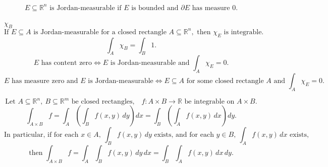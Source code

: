 \documentclass[11pt]{article}
\newcommand{\R}{\mathbb R}
\begin{document}
\[
E\subseteq\R^n\text{ is Jordan-measurable if }E\text{ is bounded and }\partial E\text{ has measure }0.
\]

\(\chi_B\)
\[
\text{If }E\subseteq A\text{ is Jordan-measurable for a closed rectangle }A\subseteq\R^n,
\text{ then }\chi_E\text{ is integrable.}
\]
\[
\int_A\chi_B=\int_B1.
\]
\[
E\text{ has content zero}\Longleftrightarrow E\text{ is Jordan-measurable and }\int_A\chi_E=0.
\]
\[
E\text{ has measure zero and }E\text{ is Jordan-measurable}
\Longleftrightarrow
E\subseteq A\text{ for some closed rectangle }A\text{ and }\int_A\chi_E=0.
\]

\[
\text{Let }A\subseteq\R^n,\ B\subseteq\R^m\text{ be closed rectangles,}
\quad f:A\times B\to\R\text{ be integrable on }A\times B.
\]
\[
\int_{A\times B}f
=\int_A\left(\int_B f(x,y)\,dy\right)dx
=\int_B\left(\int_A f(x,y)\,dx\right)dy.
\]
\[
\text{In particular, if for each }x\in A,\ \int_B f(x,y)\,dy\text{ exists,}
\text{ and for each }y\in B,\ \int_A f(x,y)\,dx\text{ exists,}
\]
\[
\text{then }\int_{A\times B}f
=\int_A\int_B f(x,y)\,dy\,dx
=\int_B\int_A f(x,y)\,dx\,dy.
\]
\end{document}
